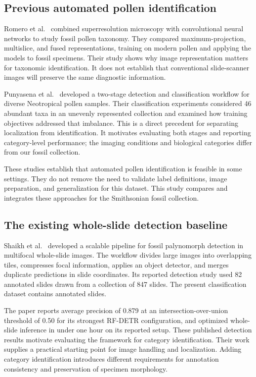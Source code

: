\documentclass[conference,letterpaper]{IEEEtran}
\begin{document}
\subsection{Previous automated pollen identification}
Romero et al.\ \cite{romero2020} combined superresolution microscopy with convolutional neural networks to study fossil pollen taxonomy. They compared maximum-projection, multislice, and fused representations, training on modern pollen and applying the models to fossil specimens. Their study shows why image representation matters for taxonomic identification. It does not establish that conventional slide-scanner images will preserve the same diagnostic information.

Punyasena et al.\ \cite{punyasena2022} developed a two-stage detection and classification workflow for diverse Neotropical pollen samples. Their classification experiments considered 46 abundant taxa in an unevenly represented collection and examined how training objectives addressed that imbalance. This is a direct precedent for separating localization from identification. It motivates evaluating both stages and reporting category-level performance; the imaging conditions and biological categories differ from our fossil collection.

These studies establish that automated pollen identification is feasible in some settings. They do not remove the need to validate label definitions, image preparation, and generalization for this dataset. This study compares and integrates these approaches for the Smithsonian fossil collection.

\subsection{The existing whole-slide detection baseline}
Shaikh et al.\ \cite{shaikh2026} developed a scalable pipeline for fossil palynomorph detection in multifocal whole-slide images. The workflow divides large images into overlapping tiles, compresses focal information, applies an object detector, and merges duplicate predictions in slide coordinates. Its reported detection study used 82 annotated slides drawn from a collection of 847 slides. The present classification dataset contains \SlideCount{} annotated slides.

The paper reports average precision of 0.879 at an intersection-over-union threshold of 0.50 for its strongest RF-DETR configuration, and optimized whole-slide inference in under one hour on its reported setup. These published detection results motivate evaluating the framework for category identification. Their work supplies a practical starting point for image handling and localization. Adding category identification introduces different requirements for annotation consistency and preservation of specimen morphology.
\end{document}
